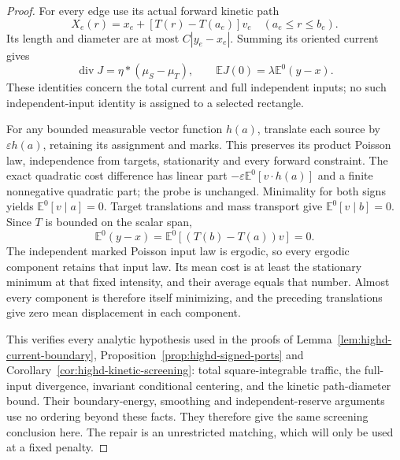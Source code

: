 \documentclass[11pt,reqno]{amsart}
\theoremstyle{definition}
\theoremstyle{remark}
\numberwithin{equation}{section}
\newcommand{\E}{\mathbb E}
\begin{document}
\begin{proof}
For every edge use its actual forward kinetic path
\[
 X_e(r)=x_e+[T(r)-T(a_e)]v_e\quad(a_e\le r\le b_e).
\]
Its length and diameter are at most \(C|y_e-x_e|\). Summing its
oriented current gives
\[
 \operatorname{div}J=\eta*(\mu_S-\mu_T),\qquad
 \E J(0)=\lambda\E^0(y-x).
\]
These identities concern the total current and full independent inputs;
no such independent-input identity is assigned to a selected rectangle.

For any bounded measurable vector function \(h(a)\), translate each
source by \(\varepsilon h(a)\), retaining its assignment and marks.
This preserves its product Poisson law, independence from targets,
stationarity and every forward constraint. The exact quadratic cost
difference has linear part \(-\varepsilon\E^0[v\cdot h(a)]\)
and a finite nonnegative quadratic part; the probe is unchanged.
Minimality for both signs yields \(\E^0[v\mid a]=0\).
Target translations and mass transport give \(\E^0[v\mid b]=0\).
Since \(T\) is bounded on the scalar span,
\[
 \E^0(y-x)=\E^0[(T(b)-T(a))v]=0.
\]
The independent marked Poisson input law is ergodic, so every ergodic
component retains that input law. Its mean cost is at least the stationary
minimum at that fixed intensity, and their average equals that number.
Almost every component is therefore
itself minimizing, and the preceding translations give zero mean
displacement in each component.

This verifies every analytic hypothesis used in the proofs of
Lemma~\ref{lem:highd-current-boundary},
Proposition~\ref{prop:highd-signed-ports} and
Corollary~\ref{cor:highd-kinetic-screening}: total square-integrable
traffic, the full-input divergence, invariant conditional centering, and
the kinetic path-diameter bound. Their boundary-energy, smoothing and
independent-reserve arguments use no ordering beyond these facts. They
therefore give the same screening conclusion here. The repair is an
unrestricted matching, which will only be used at a fixed penalty.
\end{proof}
\end{document}
